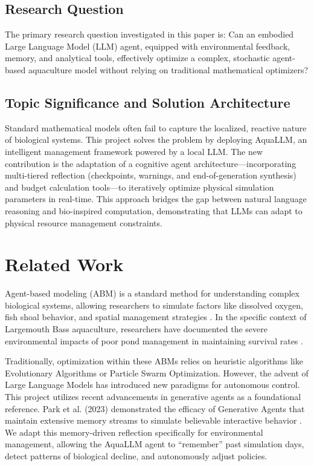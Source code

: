 \documentclass[conference]{IEEEtran}
\begin{document}
\subsection{Research Question}
The primary research question investigated in this paper is: Can an embodied Large Language Model (LLM) agent, equipped with environmental feedback, memory, and analytical tools, effectively optimize a complex, stochastic agent-based aquaculture model without relying on traditional mathematical optimizers?

\subsection{Topic Significance and Solution Architecture}
Standard mathematical models often fail to capture the localized, reactive nature of biological systems. This project solves the problem by deploying AquaLLM, an intelligent management framework powered by a local LLM. The new contribution is the adaptation of a cognitive agent architecture---incorporating multi-tiered reflection (checkpoints, warnings, and end-of-generation synthesis) and budget calculation tools---to iteratively optimize physical simulation parameters in real-time. This approach bridges the gap between natural language reasoning and bio-inspired computation, demonstrating that LLMs can adapt to physical resource management constraints.

\section{Related Work}
Agent-based modeling (ABM) is a standard method for understanding complex biological systems, allowing researchers to simulate factors like dissolved oxygen, fish shoal behavior, and spatial management strategies \cite{urbanova2023}. In the specific context of Largemouth Bass aquaculture, researchers have documented the severe environmental impacts of poor pond management in maintaining survival rates \cite{hou2023}.

Traditionally, optimization within these ABMs relies on heuristic algorithms like Evolutionary Algorithms or Particle Swarm Optimization. However, the advent of Large Language Models has introduced new paradigms for autonomous control. This project utilizes recent advancements in generative agents as a foundational reference. Park et al. (2023) demonstrated the efficacy of Generative Agents that maintain extensive memory streams to simulate believable interactive behavior \cite{park2023}. We adapt this memory-driven reflection specifically for environmental management, allowing the AquaLLM agent to ``remember'' past simulation days, detect patterns of biological decline, and autonomously adjust policies. 
\end{document}
